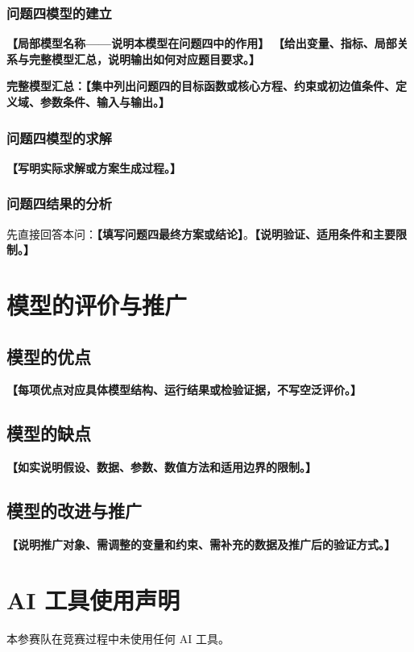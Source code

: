 \documentclass[UTF8,a4paper,12pt,zihao=-4]{ctexart}
\newcommand{\TemplateField}[1]{\textbf{【#1】}}
\newif\ifusedai
\newcommand{\AIUsageSummary}{语言润色、代码调试与排版核验等}
\begin{document}
\subsubsection{问题四模型的建立}
\noindent\TemplateField{局部模型名称——说明本模型在问题四中的作用}
\TemplateField{给出变量、指标、局部关系与完整模型汇总，说明输出如何对应题目要求。}

\noindent\textbf{完整模型汇总：}\TemplateField{集中列出问题四的目标函数或核心方程、约束或初边值条件、定义域、参数条件、输入与输出。}

\subsubsection{问题四模型的求解}
\TemplateField{写明实际求解或方案生成过程。}

\subsubsection{问题四结果的分析}
先直接回答本问：\textbf{【填写问题四最终方案或结论】}。\TemplateField{说明验证、适用条件和主要限制。}

\section{模型的评价与推广}

\subsection{模型的优点}
\TemplateField{每项优点对应具体模型结构、运行结果或检验证据，不写空泛评价。}

\subsection{模型的缺点}
\TemplateField{如实说明假设、数据、参数、数值方法和适用边界的限制。}

\subsection{模型的改进与推广}
\TemplateField{说明推广对象、需调整的变量和约束、需补充的数据及推广后的验证方式。}

\clearpage
\section*{AI 工具使用声明}
\ifusedai
本参赛队在竞赛过程中使用了 AI 工具，主要用于\AIUsageSummary，详细使用情况见支撑材料。
\else
本参赛队在竞赛过程中未使用任何 AI 工具。
\fi
\end{document}
